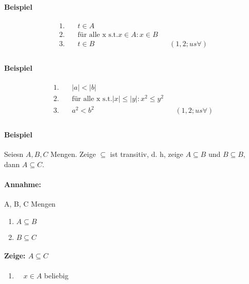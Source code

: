             \paragraph*{Beispiel}

                \begin{align*}
                    1. &\quad t \in A                   && \\
                    2. &\quad \text{für alle x s.t.} x \in A : x \in B                      && \\
                    3. &\quad t \in B && (1, 2; us \forall)\\
                \end{align*}    

            \paragraph{Beispiel}

                \begin{align*}
                    1. &\quad |a| < |b|                   && \\
                    2. &\quad \text{für alle x s.t.} |x| \leq |y| : x^2 \leq y^2                      && \\
                    3. &\quad a^2 < b^2 && (1, 2; us \forall)\\
                \end{align*}    

            \paragraph{Beispiel}
                Seiesn $A, B, C$ Mengen. Zeige $\subseteq$ ist transitiv, d. h, zeige $A \subseteq B$ und $B \subseteq B$, dann $A \subseteq C$.
                \paragraph*{Annahme: }
                    A, B, C Mengen
                    \begin{enumerate}
                        \item \(A \subseteq B\)
                        \item \(B \subseteq C\)
                    \end{enumerate}
                \paragraph*{Zeige: \(A \subseteq C\)}
                \begin{enumerate}
                    \item \(\quad  x \in A\) beliebig
                \end{enumerate}


